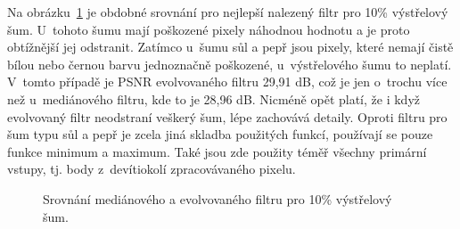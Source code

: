 Na obrázku~\ref{obrFilterImp} je obdobné srovnání pro nejlepší nalezený filtr pro 10\% výstřelový šum. U~tohoto šumu mají poškozené pixely náhodnou hodnotu a je proto obtížnější jej odstranit. Zatímco u~šumu sůl a pepř jsou pixely, které nemají čistě bílou nebo černou barvu jednoznačně poškozené, u~výstřelového šumu to neplatí. V~tomto případě je PSNR evolvovaného filtru 29,91 dB, což je jen o~trochu více než u~mediánového filtru, kde to je 28,96 dB. Nicméně opět platí, že i když evolvovaný filtr neodstraní veškerý šum, lépe zachovává detaily. Oproti filtru pro šum typu sůl a pepř je zcela jiná skladba použitých funkcí, používají se pouze funkce minimum a maximum. Také jsou zde použity téměř všechny primární vstupy, tj. body z~devítiokolí zpracovávaného pixelu.

\begin{figure}[htb]
    \centering
    \hfill
    \hfill
    \caption{Srovnání mediánového a evolvovaného filtru pro 10\% výstřelový šum.}
    \label{obrFilterImp}
\end{figure}


